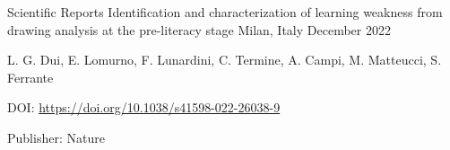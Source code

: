 \begin{cventries}
    \vspace{2mm}
    \cventry
        {Scientific Reports} %
        {Identification and characterization of learning weakness from drawing analysis at the pre-literacy stage}
        {Milan, Italy}
        {December 2022}
        {
        \begin{cvitems}
            \item {L. G. Dui, E. Lomurno, F. Lunardini, C. Termine, A. Campi, M. Matteucci, S. Ferrante}
            \item {DOI: \url{https://doi.org/10.1038/s41598-022-26038-9}}
            \item {Publisher: Nature}
        \end{cvitems}
        }

\end{cventries}